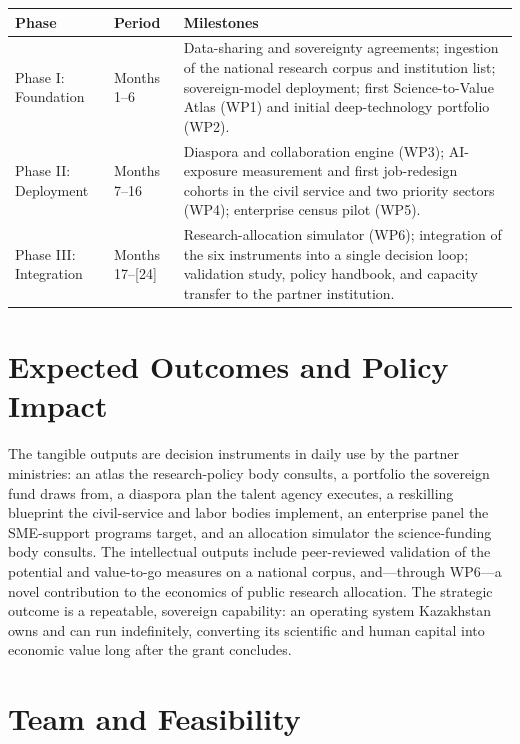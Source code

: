 \documentclass[11pt]{article}
\begin{document}
\begin{center}
\begin{tabular}{@{}p{2.4cm}p{5.2cm}p{6.2cm}@{}}
\toprule
\textbf{Phase} & \textbf{Period} & \textbf{Milestones} \\
\midrule
Phase I: Foundation & Months 1--6 &
Data-sharing and sovereignty agreements; ingestion of the national research
corpus and institution list; sovereign-model deployment; first Science-to-Value
Atlas (WP1) and initial deep-technology portfolio (WP2). \\[4pt]
Phase II: Deployment & Months 7--16 &
Diaspora and collaboration engine (WP3); AI-exposure measurement and first
job-redesign cohorts in the civil service and two priority sectors (WP4);
enterprise census pilot (WP5). \\[4pt]
Phase III: Integration & Months 17--[24] &
Research-allocation simulator (WP6); integration of the six instruments into a
single decision loop; validation study, policy handbook, and capacity transfer to
the partner institution. \\
\bottomrule
\end{tabular}
\end{center}

\section{Expected Outcomes and Policy Impact}

The tangible outputs are decision instruments in daily use by the partner
ministries: an atlas the research-policy body consults, a portfolio the sovereign
fund draws from, a diaspora plan the talent agency executes, a reskilling
blueprint the civil-service and labor bodies implement, an enterprise panel the
SME-support programs target, and an allocation simulator the science-funding body
consults. The intellectual outputs include peer-reviewed validation of the
potential and value-to-go measures on a national corpus, and---through WP6---a
novel contribution to the economics of public research allocation. The strategic
outcome is a repeatable, sovereign capability: an operating system Kazakhstan
owns and can run indefinitely, converting its scientific and human capital into
economic value long after the grant concludes.

\section{Team and Feasibility}
\end{document}
